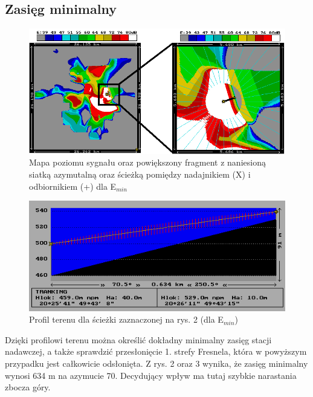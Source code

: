 \documentclass[12pt, a4paper, oneside]{article}
\begin{document}
\subsection{Zasięg minimalny}
\begin{figure}[h!]
\centering
\includegraphics[scale=0.9]{pics/mapki/f2.png}
\caption{Mapa poziomu sygnału oraz powiększony fragment z naniesioną siatką azymutalną oraz ścieżką pomiędzy nadajnikiem (X) i odbiornikiem (+) dla E$_{min}$}
\end{figure}
\clearpage
\begin{figure}[h!]
\centering
\includegraphics[scale=1.1]{pics/mapki/f3.png}
\caption{Profil terenu dla ścieżki zaznaczonej na rys. 2 (dla E$_{min}$)}
\end{figure}
Dzięki profilowi terenu można określić dokładny minimalny zasięg stacji nadawczej, a także sprawdzić przesłonięcie 1. strefy Fresnela, która w powyższym  przypadku jest całkowicie odsłonięta. Z rys. 2 oraz 3 wynika, że zasięg minimalny wynosi 634 m na azymucie 70\textdegree. Decydujący wpływ ma tutaj szybkie narastania zbocza góry.
\end{document}
